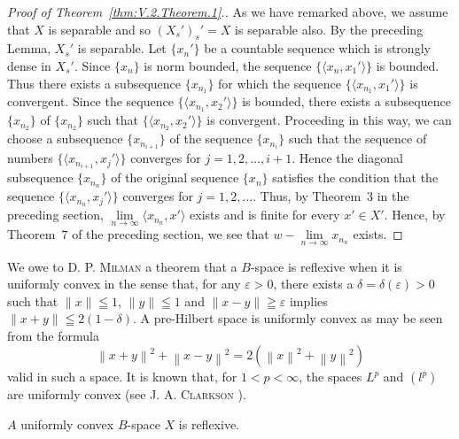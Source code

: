 \begin{proof}[Proof of Theorem~\ref{thm:V.2.Theorem.1}.]
As we have remarked above, we assume that $X$ is separable and so $(X_s')_s' = X$ is separable also. By the preceding Lemma, $X_s'$ is separable. Let $\{x_n'\}$ be a countable sequence which is strongly dense in $X_s'$. Since $\{x_n\}$ is norm bounded, the sequence $\{\langle x_n, x_1' \rangle\}$ is bounded. Thus there exists a subsequence $\{x_{n_1}\}$ for which the sequence $\{\langle x_{n_1}, x_1' \rangle\}$ is convergent. Since the sequence $\{\langle x_{n_1}, x_2' \rangle\}$ is bounded, there exists a subsequence $\{x_{n_2}\}$ of $\{x_{n_2}\}$ such that $\{\langle x_{n_2}, x_2' \rangle\}$ is convergent. Proceeding in this way, we can choose a subsequence $\{x_{n_{i+1}}\}$ of the sequence $\{x_{n_{i}}\}$ such that the sequence of numbers $\{\langle x_{n_{i+1}}, x_j' \rangle\}$ converges for $j = 1, 2, \ldots, i + 1$. Hence the diagonal subsequence $\{x_{n_{n}}\}$ of the original sequence $\{x_n\}$ satisfies the condition that the sequence $\{\langle x_{n_{n}}, x_j' \rangle\}$ converges for $j = 1, 2, \ldots$. Thus, by Theorem~\hyperref[thm:V.1.Theorem.3]{$3$} in the preceding section, $\lim\limits_{n \to \infty} \langle x_{n_{n}}, x' \rangle$ exists and is finite for every $x' \in X'$. Hence, by Theorem~\hyperref[thm:V.1.Theorem.7]{$7$} of the preceding section, we see that $w - \lim\limits_{n \to \infty} x_{n_{n}}$ exists.
\end{proof}


We owe to D. P. \textsc{Milman} a theorem that a $B$-space is reflexive when it is uniformly convex in the sense that, for any $\varepsilon > 0$, there exists a $\delta = \delta (\varepsilon) > 0$ such that $\|x\| \leqq 1$, $\|y\| \leqq 1$ and $\|x - y\| \geqq \varepsilon$ implies $\|x + y\| \leqq 2(1 - \delta)$. A pre-Hilbert space is uniformly convex as may be seen from the formula 
\[
\left\| x + y \right\| ^{2} + \left\| x - y \right\| ^{2} = 2 \left(\left\| x \right\| ^{2} + \left\| y \right\| ^{2}\right)
\]
valid in such a space. It is known that, for $1 < p < \infty$, the spaces $L^p$ and $(l^p)$ are uniformly convex (see J. A. \textsc{Clarkson} \cite{clarkson35}). 

\begin{theorem}\label{thm:V.2.Theorem.2} $A$ uniformly convex $B$-space $X$ is reflexive. 
\end{theorem}

